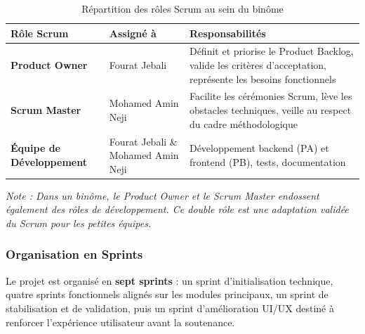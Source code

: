\documentclass[12pt,a4paper]{report}
\begin{document}
\begin{table}[H]
\centering
\caption{Répartition des rôles Scrum au sein du binôme}
\begin{tabular}{|p{4cm}|p{4cm}|p{6cm}|}
\hline
\textbf{Rôle Scrum} & \textbf{Assigné à} & \textbf{Responsabilités} \\
\hline
\textbf{Product Owner} & Fourat Jebali & Définit et priorise le Product Backlog, valide les critères d'acceptation, représente les besoins fonctionnels \\
\hline
\textbf{Scrum Master} & Mohamed Amin Neji & Facilite les cérémonies Scrum, lève les obstacles techniques, veille au respect du cadre méthodologique \\
\hline
\textbf{Équipe de Développement} & Fourat Jebali \& Mohamed Amin Neji & Développement backend (PA) et frontend (PB), tests, documentation \\
\hline
\end{tabular}
\end{table}

\textit{Note : Dans un binôme, le Product Owner et le Scrum Master endossent également des rôles de développement. Ce double rôle est une adaptation validée du Scrum pour les petites équipes.}

\subsubsection{Organisation en Sprints}

Le projet est organisé en \textbf{sept sprints} : un sprint d'initialisation technique, quatre sprints fonctionnels alignés sur les modules principaux, un sprint de stabilisation et de validation, puis un sprint d'amélioration UI/UX destiné à renforcer l'expérience utilisateur avant la soutenance.
\end{document}
